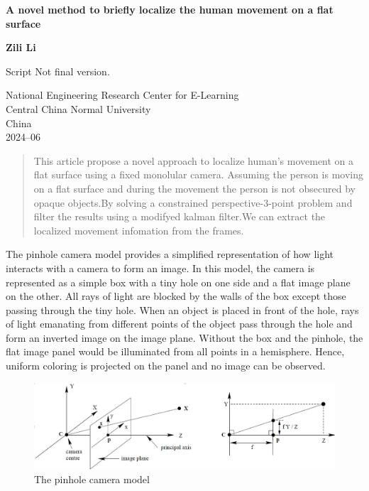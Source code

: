 \documentclass{article}
\begin{document}
\begin{titlepage}
    \begin{center}
        \vspace*{1cm}
        \Huge
        \textbf{A novel method to briefly localize the human movement on a flat surface}

        \vspace{1.5cm}


        \vspace{1.5cm}
        \LARGE
        \textbf{Zili Li}

        \vfill

        Script Not final version.

        \vspace{0.8cm}
        \normalsize

        National Engineering Research Center for E-Learning\\
        Central China Normal University\\
        China \\
        2024--06

    \end{center}
\end{titlepage}
\begin{abstract}
    This article propose a novel approach to localize human's movement on a flat surface using a fixed monolular camera. Assuming the person is moving on a flat surface and during the movement the person is not obsecured by opaque objects.By solving a constrained perspective-3-point problem and filter the results using a modifyed kalman filter.We can extract the localized movement infomation from the frames.
\end{abstract}
The pinhole camera model provides a simplified representation of how light interacts with a camera to form an image. In this model, the camera is represented as a simple box with a tiny hole on one side and a flat image plane on the other. All rays of light are blocked by the walls of the box except those passing through the tiny hole.
When an object is placed in front of the hole, rays of light emanating from different points of the object pass through the hole and form an inverted image on the image plane. Without the box and the pinhole, the flat image panel would be illuminated from all points in a hemisphere. Hence, uniform coloring is projected on the panel and no image can be observed.

\begin{figure}[h!]
    \includegraphics[width=\linewidth]{fig1.1.png}
    \caption{The pinhole camera model}\label{fig:1.1}
\end{figure}
\end{document}
